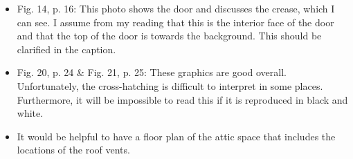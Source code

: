 \documentclass[12pt]{article}
\begin{document}
\begin{itemize}
\item Fig. 14, p. 16: This photo shows the door and discusses the crease, which I can see. I assume from my reading that this is the interior face of the door and that the top of the door is towards the background. This should be clarified in the caption.
\item Fig. 20, p. 24 \& Fig. 21, p. 25: These graphics are good overall. Unfortunately, the cross-hatching is difficult to interpret in some places. Furthermore, it will be impossible to read this if it is reproduced in black and white.
\item  It would be helpful to have a floor plan of the attic space that includes the locations of the roof vents.
\end{itemize}
\end{document}
